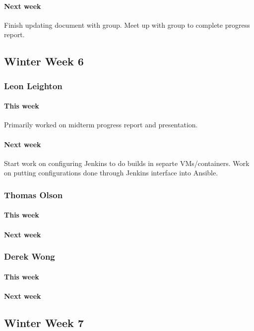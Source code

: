 \documentclass[10pt,letterpaper,onecolumn,draftclsnofoot]{IEEEtran}
\begin{document}
\paragraph{Next week}Finish updating document with group.       
Meet up with group to complete progress report.


\subsection{Winter Week 6}
\subsubsection{Leon Leighton}
\paragraph{This week}Primarily worked on midterm progress report and presentation.
\paragraph{Next week}Start work on configuring Jenkins to do builds in separte VMs/containers.  
Work on putting configurations done through Jenkins interface into Ansible.


\subsubsection{Thomas Olson}
\paragraph{This week}
\paragraph{Next week}


\subsubsection{Derek Wong}
\paragraph{This week}
\paragraph{Next week}


\subsection{Winter Week 7}
\end{document}

